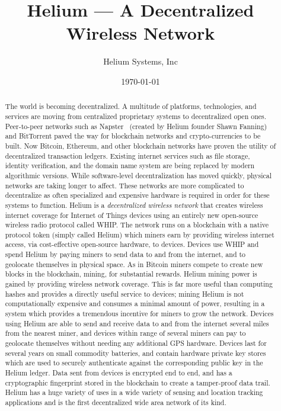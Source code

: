 \documentclass[letterpaper,11pt]{article}
\begin{document}
\title{Helium --- A Decentralized Wireless Network}
\author{Helium Systems, Inc}
\date{\today}
\maketitle
\newpage

\begin{abstract}
The world is becoming decentralized. A multitude of platforms, technologies, and services are moving from centralized proprietary systems to decentralized open ones. Peer-to-peer networks such as Napster~\cite{napster} (created by Helium founder Shawn Fanning) and BitTorrent paved the way for blockchain networks and crypto-currencies to be built. Now Bitcoin, Ethereum, and other blockchain networks have proven the utility of decentralized transaction ledgers. Existing internet services such as file storage, identity verification, and the domain name system are being replaced by modern algorithmic versions. While software-level decentralization has moved quickly, physical networks are taking longer to affect. These networks are more complicated to decentralize as often specialized and expensive hardware is required in order for these systems to function.\newline
\newline
Helium is a \emph{decentralized wireless network} that creates wireless internet coverage for Internet of Things devices using an entirely new open-source wireless radio protocol called WHIP. The network runs on a blockchain with a native protocol token (simply called Helium) which miners earn by providing wireless internet access, via cost-effective open-source hardware, to devices. Devices use WHIP and spend Helium by paying miners to send data to and from the internet, and to geolocate themselves in physical space. As in Bitcoin miners compete to create new blocks in the blockchain, mining, for substantial rewards. Helium mining power is gained by providing wireless network coverage. This is far more useful than computing hashes and provides a directly useful service to devices; mining Helium is not computationally expensive and consumes a minimal amount of power, resulting in a system which provides a tremendous incentive for miners to grow the network. Devices using Helium are able to send and receive data to and from the internet several miles from the nearest miner, and devices within range of several miners can pay to geolocate themselves without needing any additional GPS hardware. Devices last for several years on small commodity batteries, and contain hardware private key stores which are used to securely authenticate against the corresponding public key in the Helium ledger. Data sent from devices is encrypted end to end, and has a cryptographic fingerprint stored in the blockchain to create a tamper-proof data trail.
\newline\newline
Helium has a huge variety of uses in a wide variety of sensing and location tracking applications and is the first decentralized wide area network of its kind.
\end{abstract}
\end{document}
